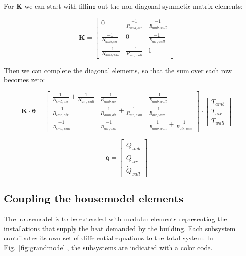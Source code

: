For $\mathbf{K}$ we can start with filling out the non-diagonal symmetic matrix elements:

\begin{equation}
		\mathbf{K} =
	\begin{bmatrix}
		0  & \frac{-1}{R_{amb,air}} & \frac{-1}{R_{amb,wall}}  \\
		\frac{-1}{R_{amb, air}} &  0 &  \frac{-1}{R_{air,wall}} \\
		\frac{-1}{R_{amb,wall}} & \frac{-1}{R_{air, wall}}  & 0 
	\end{bmatrix}
\end{equation}

Then we can complete the diagonal elements, so that the sum over each row becomes zero:

\begin{equation}
	\mathbf{K} \cdot \boldsymbol{\theta} =
	\begin{bmatrix}
		\frac{1}{R_{amb, air}} + \frac{1}{R_{air,wall}}  & \frac{-1}{R_{amb,air}} & \frac{-1}{R_{amb,wall}}  \\
		\frac{-1}{R_{amb, air}} &  \frac{1}{R_{amb, air}} + \frac{1}{R_{air,wall}} &  \frac{-1}{R_{air,wall}} \\
		\frac{-1}{R_{amb,wall}} & \frac{-1}{R_{air, wall}}  & \frac{1}{R_{amb, wall}} + \frac{1}{R_{air,wall}} 
	\end{bmatrix}
	\cdot
	\begin{bmatrix}
		T_{amb} \\
		T_{air} \\
		T_{wall}
	\end{bmatrix}
\end{equation}

\begin{equation}
	\mathbf{\dot{q}} =
	\begin{bmatrix}
		\dot{Q}_{amb}\\
		\dot{Q}_{air} \\
		\dot{Q}_{wall} 
	\end{bmatrix}
\end{equation}

\subsection{Coupling the housemodel elements}

The housemodel is to be extended with modular elements representing the installations that supply the heat demanded by the building. Each subsystem contributes its own set of differential equations to the total system. In Fig.~\ref{fig:grandmodel}, the subsystems are indicated with a color code.

